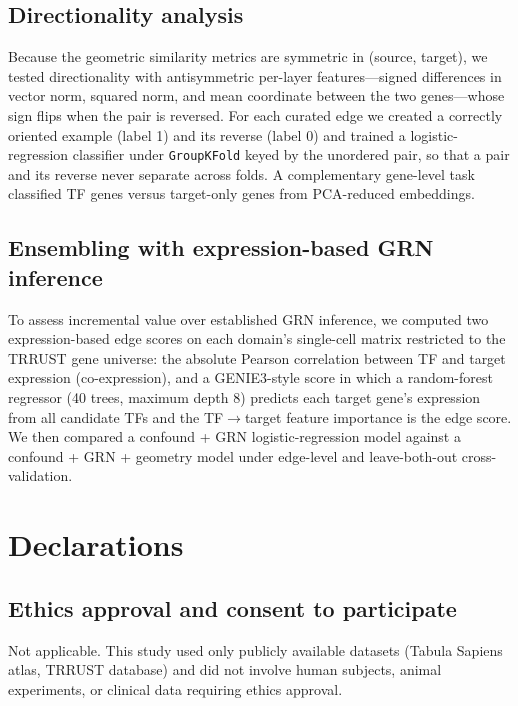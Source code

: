 \documentclass[11pt]{article}
\begin{document}
\subsection*{Directionality analysis}

Because the geometric similarity metrics are symmetric in (source, target), we tested directionality with antisymmetric per-layer features---signed differences in vector norm, squared norm, and mean coordinate between the two genes---whose sign flips when the pair is reversed.
For each curated edge we created a correctly oriented example (label 1) and its reverse (label 0) and trained a logistic-regression classifier under \texttt{GroupKFold} keyed by the unordered pair, so that a pair and its reverse never separate across folds.
A complementary gene-level task classified TF genes versus target-only genes from PCA-reduced embeddings.

\subsection*{Ensembling with expression-based GRN inference}

To assess incremental value over established GRN inference, we computed two expression-based edge scores on each domain's single-cell matrix restricted to the TRRUST gene universe: the absolute Pearson correlation between TF and target expression (co-expression), and a GENIE3-style \cite{huynh2010inferring} score in which a random-forest regressor (40 trees, maximum depth 8) predicts each target gene's expression from all candidate TFs and the TF$\rightarrow$target feature importance is the edge score.
We then compared a confound + GRN logistic-regression model against a confound + GRN + geometry model under edge-level and leave-both-out cross-validation.


\section*{Declarations}

\subsection*{Ethics approval and consent to participate}
Not applicable. This study used only publicly available datasets (Tabula Sapiens atlas, TRRUST database) and did not involve human subjects, animal experiments, or clinical data requiring ethics approval.
\end{document}

